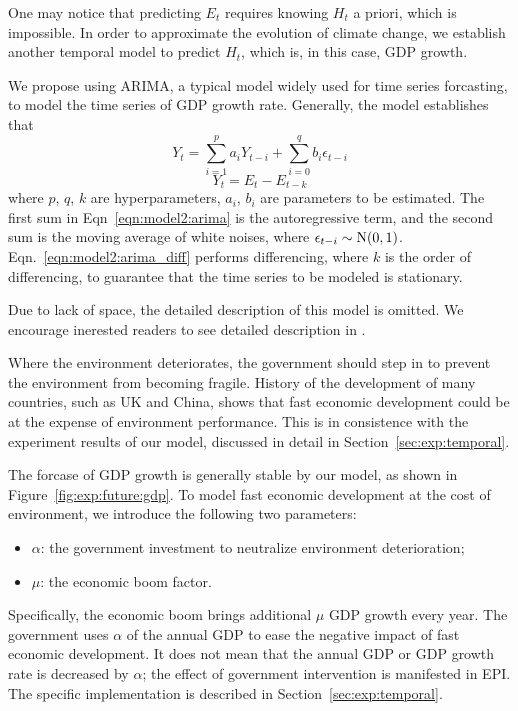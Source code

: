 One may notice that predicting $E_t$ requires knowing $H_{t}$ a priori, which is impossible. In order to approximate the evolution of climate change, we establish another temporal model to predict $H_t$, which is, in this case, GDP growth. 

We propose using ARIMA, a typical model widely used for time series forcasting, to model the time series of GDP growth rate.
Generally, the model establishes that
\begin{equation}
   Y_t = \sum_{i=1}^p a_i Y_{t-i} +\sum_{i=0}^q b_i \epsilon_{t-i}
   \label{eqn:model2:arima}
\end{equation}
\begin{equation}
   Y_t = E_t - E_{t-k}
   \label{eqn:model2:arima_diff}
\end{equation}
where $p$, $q$, $k$ are hyperparameters, $a_i$, $b_i$ are parameters to be estimated. 
The first sum in Eqn~\ref{eqn:model2:arima} is the autoregressive term, and the second sum is the moving average of white noises, where $\epsilon_{t-i}\sim \rm{N}(0,1)$. Eqn.~\ref{eqn:model2:arima_diff} performs differencing, where $k$ is the order of differencing, to guarantee that the time series to be modeled is stationary.

Due to lack of space, the detailed description of this model is omitted. We encourage inerested readers to see detailed description in .

Where the environment deteriorates, the government should step in to prevent the environment from becoming fragile. 
History of the development of many countries, such as UK and China, shows that fast economic development could be at the expense of environment performance. 
This is in consistence with the experiment results of our model, discussed in detail in Section~\ref{sec:exp:temporal}.

The forcase of GDP growth is generally stable by our model, as shown in Figure~\ref{fig:exp:future:gdp}. To model fast economic development at the cost of environment, we introduce the following two parameters:
\begin{itemize}
  \item $\alpha$: the government investment to neutralize environment deterioration;
  \item $\mu$: the economic boom factor.
\end{itemize}
Specifically, the economic boom brings additional $\mu$ GDP growth every year. The government uses $\alpha$ of the annual GDP to ease the negative impact of fast economic development. It does not mean that the annual GDP or GDP growth rate is decreased by $\alpha$; the effect of government intervention is manifested in EPI. The specific implementation is described in Section~\ref{sec:exp:temporal}.

